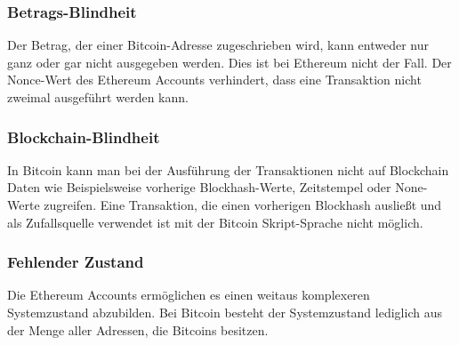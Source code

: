 \subsubsection{Betrags-Blindheit}
Der Betrag, der einer Bitcoin-Adresse zugeschrieben wird, kann entweder nur ganz oder gar nicht ausgegeben werden. Dies ist bei Ethereum nicht der Fall. Der Nonce-Wert des Ethereum Accounts verhindert, dass eine Transaktion nicht zweimal ausgeführt werden kann.
\subsubsection{Blockchain-Blindheit}
In Bitcoin kann man bei der Ausführung der Transaktionen nicht auf Blockchain Daten wie Beispielsweise vorherige Blockhash-Werte, Zeitstempel oder None-Werte zugreifen. Eine Transaktion, die einen vorherigen Blockhash ausließt und als Zufallsquelle verwendet ist mit der Bitcoin Skript-Sprache nicht möglich.
\subsubsection{Fehlender Zustand}
Die Ethereum Accounts ermöglichen es einen weitaus komplexeren Systemzustand abzubilden. Bei Bitcoin besteht der Systemzustand lediglich aus der Menge aller Adressen, die Bitcoins besitzen.